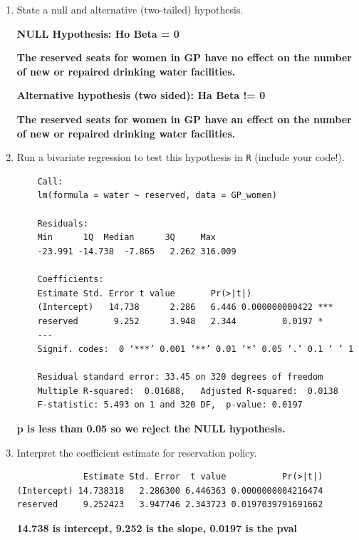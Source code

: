 \documentclass[12pt,letterpaper]{article}
\begin{document}
\newpage
\begin{enumerate}
	 
	\item [(a)] State a null and alternative (two-tailed) hypothesis.
	 
	\textbf {NULL Hypothesis: Ho Beta = 0}
	
	\textbf {The reserved seats for women in GP have no effect on the number of new or repaired drinking water facilities.}
		
		
	\textbf {Alternative hypothesis (two sided): Ha Beta != 0}
	
	\textbf {The reserved seats for women in GP have an effect on the number of new or repaired drinking water facilities.}
	\item [(b)] Run a bivariate regression to test this hypothesis in \texttt{R} (include your code!).
	
		 
		\begin{verbatim}
	Call:
	lm(formula = water ~ reserved, data = GP_women)
	
	Residuals:
	Min      1Q  Median      3Q     Max 
	-23.991 -14.738  -7.865   2.262 316.009 
	
	Coefficients:
	Estimate Std. Error t value       Pr(>|t|)    
	(Intercept)   14.738      2.286   6.446 0.000000000422 ***
	reserved       9.252      3.948   2.344         0.0197 *  
	---
	Signif. codes:  0 ‘***’ 0.001 ‘**’ 0.01 ‘*’ 0.05 ‘.’ 0.1 ‘ ’ 1
	
	Residual standard error: 33.45 on 320 degrees of freedom
	Multiple R-squared:  0.01688,	Adjusted R-squared:  0.0138 
	F-statistic: 5.493 on 1 and 320 DF,  p-value: 0.0197
		\end{verbatim}
	\textbf {p is less than 0.05 so we reject the NULL hypothesis.}
	
	\item [(c)] Interpret the coefficient estimate for reservation policy. 
	
			 
	\begin{verbatim}
             Estimate Std. Error  t value           Pr(>|t|)
(Intercept) 14.738318   2.286300 6.446363 0.0000000004216474
reserved     9.252423   3.947746 2.343723 0.0197039791691662
	\end{verbatim}
	
		\textbf {14.738 is intercept, 9.252 is the slope, 0.0197 is the pval}
			

\end{enumerate}
\end{document}
